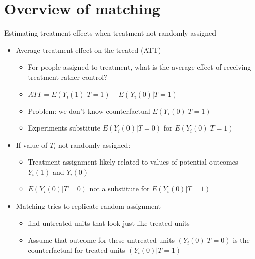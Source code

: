 \section[Matching overview]{Overview of matching}

\begin{frame}{Estimating treatment effects when treatment not randomly assigned}{}

	\begin{itemize}
		\item Average treatment effect on the treated (ATT)
		\begin{itemize}
			\item For people assigned to treatment, what is the average effect of receiving treatment rather control?
			\item $ ATT=E(Y_i(1)|T=1)-E(Y_i(0)|T=1) $
			\item Problem: we don't know counterfactual $E(Y_i(0)|T=1) $
			\item Experiments substitute $E(Y_i(0)|T=0) $ for $E(Y_i(0)|T=1) $
		\end{itemize}
		\item If value of $T_i$ not randomly assigned:
		\begin{itemize}
			\item Treatment assignment likely related to values of potential outcomes $Y_i(1) $ and $Y_i(0)$
			\item $E(Y_i(0)|T=0) $ not a substitute for $E(Y_i(0)|T=1) $
		\end{itemize}
		\item Matching tries to replicate random assignment
		\begin{itemize}
			\item find untreated units that look just like treated units
			\item Assume that outcome for these untreated units $(Y_i(0)|T=0)$ is the counterfactual for treated units $(Y_i(0)|T=1)$
		\end{itemize}
	\end{itemize}
	

\end{frame}

